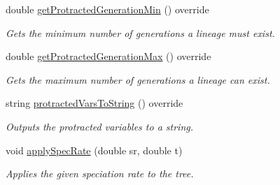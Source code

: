 \begin{DoxyCompactItemize}
double \hyperlink{class_protracted_tree_a331561815abc7d595e88d98e9268e7a1}{get\+Protracted\+Generation\+Min} () override
\begin{DoxyCompactList}\small\item\em Gets the minimum number of generations a lineage must exist. \end{DoxyCompactList}\item 
double \hyperlink{class_protracted_tree_a2093dd13cdbfc66e6c1de1406023bad6}{get\+Protracted\+Generation\+Max} () override
\begin{DoxyCompactList}\small\item\em Gets the maximum number of generations a lineage can exist. \end{DoxyCompactList}\item 
string \hyperlink{class_protracted_tree_a505a464578e6a7028e66f26b3e6b4a92}{protracted\+Vars\+To\+String} () override
\begin{DoxyCompactList}\small\item\em Outputs the protracted variables to a string. \end{DoxyCompactList}\item 
void \hyperlink{class_protracted_tree_a56a3631e65bb91d04ba4626c4c1ea79a}{apply\+Spec\+Rate} (double sr, double t)
\begin{DoxyCompactList}\small\item\em Applies the given speciation rate to the tree. \end{DoxyCompactList}\end{DoxyCompactItemize}
